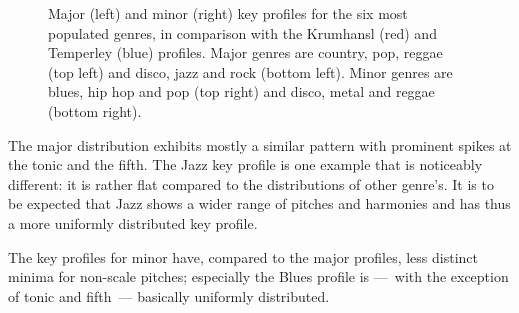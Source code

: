 \documentclass{article}
\begin{document}
\begin{figure}[tb]
	\caption{Major (left) and minor (right) key profiles for the six most populated genres, in comparison with the Krumhansl (red) and Temperley (blue) profiles. Major genres are country, pop, reggae (top left) and disco, jazz and rock (bottom left). Minor genres are blues, hip hop and pop (top right) and disco, metal and reggae (bottom right).}
	\label{fig:SpecificKeyProfiles}
\end{figure}
The major distribution exhibits mostly a similar pattern with prominent spikes at the tonic and the fifth. The Jazz key profile is one example that is noticeably different: it is rather flat compared to the distributions of other genre's. It is to be expected that Jazz shows a wider range of pitches and harmonies and has thus a more uniformly distributed key profile.

The key profiles for minor have, compared to the major profiles, less distinct minima for non-scale pitches; especially the Blues profile is ---~with the exception of tonic and fifth~--- basically uniformly distributed.
\end{document}
